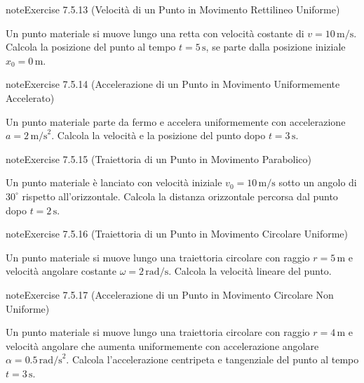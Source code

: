 \documentclass[letterpaper,10pt,italian]{jupyterBook}
\begin{document}
\begin{sphinxadmonition}{note}{Exercise 7.5.13 (Velocità di un Punto in Movimento Rettilineo Uniforme)}



\sphinxAtStartPar
Un punto materiale si muove lungo una retta con velocità costante di \(v = 10 \, \text{m/s}\). Calcola la posizione del punto al tempo \(t = 5 \, \text{s}\), se parte dalla posizione iniziale \(x_0 = 0 \, \text{m}\).
\end{sphinxadmonition}
 \label{exercise:ch/mechanics/kinematics-problems-exercise-13}

\begin{sphinxadmonition}{note}{Exercise 7.5.14 (Accelerazione di un Punto in Movimento Uniformemente Accelerato)}



\sphinxAtStartPar
Un punto materiale parte da fermo e accelera uniformemente con accelerazione \(a = 2 \, \text{m/s}^2\). Calcola la velocità e la posizione del punto dopo \(t = 3 \, \text{s}\).
\end{sphinxadmonition}
 \label{exercise:ch/mechanics/kinematics-problems-exercise-14}

\begin{sphinxadmonition}{note}{Exercise 7.5.15 (Traiettoria di un Punto in Movimento Parabolico)}



\sphinxAtStartPar
Un punto materiale è lanciato con velocità iniziale \(v_0 = 10 \, \text{m/s}\) sotto un angolo di \(30^\circ\) rispetto all’orizzontale. Calcola la distanza orizzontale percorsa dal punto dopo \(t = 2 \, \text{s}\).
\end{sphinxadmonition}
 \label{exercise:ch/mechanics/kinematics-problems-exercise-15}

\begin{sphinxadmonition}{note}{Exercise 7.5.16 (Traiettoria di un Punto in Movimento Circolare Uniforme)}



\sphinxAtStartPar
Un punto materiale si muove lungo una traiettoria circolare con raggio \(r = 5 \, \text{m}\) e velocità angolare costante \(\omega = 2 \, \text{rad/s}\). Calcola la velocità lineare del punto.
\end{sphinxadmonition}
 \label{exercise:ch/mechanics/kinematics-problems-exercise-16}

\begin{sphinxadmonition}{note}{Exercise 7.5.17 (Accelerazione di un Punto in Movimento Circolare Non Uniforme)}



\sphinxAtStartPar
Un punto materiale si muove lungo una traiettoria circolare con raggio \(r = 4 \, \text{m}\) e velocità angolare che aumenta uniformemente con accelerazione angolare \(\alpha = 0.5 \, \text{rad/s}^2\). Calcola l’accelerazione centripeta e tangenziale del punto al tempo \(t = 3 \, \text{s}\).
\end{sphinxadmonition}
\end{document}
